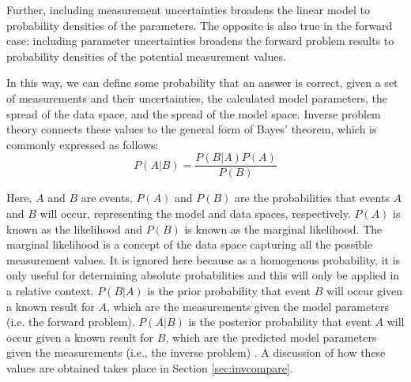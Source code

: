 Further, including measurement uncertainties broadens the linear model
to probability densities of the parameters. The opposite is also true in the
forward case: including parameter uncertainties broadens the forward problem
results to probability densities of the potential measurement values.
\cite{inverse_theory}

In this way, we can define some probability that an answer is correct, given a
set of measurements and their uncertainties, the calculated model parameters,
the spread of the data space, and the spread of the model space. Inverse
problem theory connects these values to the general form of Bayes' theorem,
which is commonly expressed as follows:
\begin{equation}
  \label{eq:bayes}
  P(A|B) = \frac{P(B|A)P(A)}{P(B)}
\end{equation}

Here, $A$ and $B$ are events, $P(A)$ and $P(B)$ are the probabilities that
events $A$ and $B$ will occur, representing the model and data spaces,
respectively. $P(A)$ is known as the likelihood and $P(B)$ is known as the
marginal likelihood. The marginal likelihood is a concept of the data space
capturing all the possible measurement values. It is ignored here because as a
homogenous probability, it is only useful for determining absolute
probabilities and this will only be applied in a relative context.  $P(B|A)$ is
the prior probability that event $B$ will occur given a known result for $A$,
which are the measurements given the model parameters (i.e. the forward
problem).  $P(A|B)$ is the posterior probability that event $A$ will occur
given a known result for $B$, which are the predicted model parameters given
the measurements (i.e., the inverse problem) \cite{inverse_theory,
gentle_bayes}. A discussion of how these values are obtained takes place in
Section \ref{sec:invcompare}.


